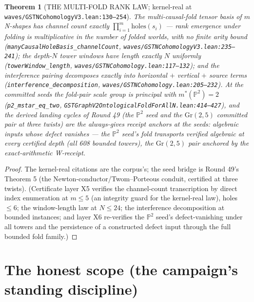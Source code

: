 \documentclass[11pt]{article}
\newtheorem{theorem}{Theorem}[section]
\begin{document}
\begin{theorem}[THE MULTI-FOLD RANK LAW; kernel-real at \texttt{waves/GSTNCohomologyV3.lean:130--254}]
\label{thm:ncoh}
The multi-causal-fold tensor basis of $m$ N-shapes has channel count exactly $\prod_{i=1}^{m}\mathrm{holes}(s_i)$ — rank emergence under folding is \emph{multiplicative} in the number of folded worlds, with \emph{no finite arity bound} (\texttt{manyCausalHoleBasis\_channelCount}, \texttt{waves/GSTNCohomologyV3.lean:235--241}); the depth-$N$ tower windows have length exactly $N$ uniformly (\texttt{towerWindow\_length}, \texttt{waves/GSTNCohomology.lean:117--132}); and the interference pairing decomposes exactly into horizontal $+$ vertical $+$ source terms (\texttt{interference\_decomposition}, \texttt{waves/GSTNCohomology.lean:205--232}). At the committed seeds the fold-pair scale group is principal with $m^*(\mathbb{P}^2)=2$ (\texttt{p2\_mstar\_eq\_two}, \texttt{GSTGraphV2OntologicalFoldForAllN.lean:414--427}), and the derived landing cycles of Round 49 (the $\mathbb{P}^2$ seed and the $\mathrm{Gr}(2,5)$ committed pair at three twists) are the always-gives receipt anchors at the seeds: algebraic inputs whose defect vanishes — the $\mathbb{P}^2$ seed's fold transports verified algebraic at every certified depth (all 608 bounded towers), the $\mathrm{Gr}(2,5)$ pair anchored by the exact-arithmetic W-receipt.
\end{theorem}

\begin{proof}
The kernel-real citations are the corpus's; the seed bridge is Round 49's Theorem 5 (the Newton-conductor/Twom--Porteous conduit, certified at three twists). (Certificate layer X5 verifies the channel-count transcription by direct index enumeration at $m\le 5$ (an integrity guard for the kernel-real law), holes $\le 6$; the window-length law at $N\le 24$; the interference decomposition at bounded instances; and layer X6 re-verifies the $\mathbb{P}^2$ seed's defect-vanishing under all towers and the persistence of a constructed defect input through the full bounded fold family.)
\end{proof}

\section{The honest scope (the campaign's standing discipline)}
\end{document}
